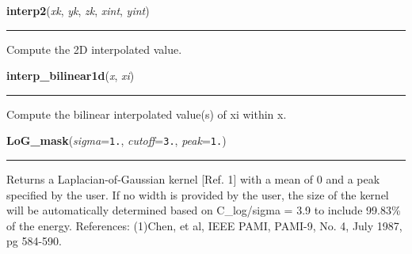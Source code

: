     \label{multireg:edge_detect:interp2}
    \vspace{0.5ex}

    \begin{boxedminipage}{\textwidth}

    \raggedright \textbf{interp2}(\textit{xk}, \textit{yk}, \textit{zk}, \textit{xint}, \textit{yint})

    \vspace{-1.5ex}

    \rule{\textwidth}{0.5\fboxrule}
    Compute the 2D interpolated value.

    \vspace{1ex}

    \end{boxedminipage}

    \label{multireg:edge_detect:interp_bilinear1d}
    \vspace{0.5ex}

    \begin{boxedminipage}{\textwidth}

    \raggedright \textbf{interp\_bilinear1d}(\textit{x}, \textit{xi})

    \vspace{-1.5ex}

    \rule{\textwidth}{0.5\fboxrule}
    Compute the bilinear interpolated value(s) of xi within x.

    \vspace{1ex}

    \end{boxedminipage}

    \label{multireg:edge_detect:LoG_mask}
    \vspace{0.5ex}

    \begin{boxedminipage}{\textwidth}

    \raggedright \textbf{LoG\_mask}(\textit{sigma}=\texttt{1\-.\-}, \textit{cutoff}=\texttt{3\-.\-}, \textit{peak}=\texttt{1\-.\-})

    \vspace{-1.5ex}

    \rule{\textwidth}{0.5\fboxrule}
    Returns a Laplacian-of-Gaussian kernel [Ref. 1] with a mean of 0 and 
    a peak specified by the user. If no width is provided by the user, 
    the size of the kernel will be automatically determined based on 
    C\_log/sigma = 3.9 to include 99.83\% of the energy. References: 
    (1)Chen, et al, IEEE PAMI, PAMI-9, No. 4, July 1987, pg 584-590.

    \vspace{1ex}

    \end{boxedminipage}

